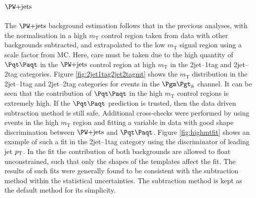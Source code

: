 \subsection{$\WJets$}

The $\WJets$ background estimation follows that in the previous analyses, with
the normalisation in a high $m_{\text{T}}$ control region taken from data with
other backgrounds subtracted, and extrapolated to the low $m_{\text{T}}$ signal
region using a scale factor from \ac{MC}. Here,
care must be taken due to the high quantity of $\ttbar$ in the $\WJets$ control
region at high $m_{\text{T}}$ in the 2jet--1tag and 2jet--2tag categories. 
Figure \ref{fig:2jet1tag2jet2tagmt} shows the 
$m_{\text{T}}$ distribution in the 2jet--1tag and 2jet--2tag categories for
events in the $\mutau$ channel. It can
be seen that the contribution of $\ttbar$ in the high $m_{\text{T}}$ control
regions is extremely high. If the $\ttbar$ prediction is trusted, then the data
driven subtraction method is still safe. Additional cross-checks were performed by
using events in the high $m_{\text{T}}$ region and fitting a variable in data
with good shape discrimination between $\WJets$ and $\ttbar$. Figure
\ref{fig:highmtfit} shows an example of such a fit in the 2jet--1tag category
using the discriminator of leading jet $p_{\mathrm{T}}$. In the fit the contribution of
both backgrounds are allowed to float unconstrained, such that only the shapes of
the templates affect the fit. The results of such fits were generally found to be
consistent with the subtraction method within the statistical uncertainties.
The subtraction method is kept as the default method for its simplicity.  


